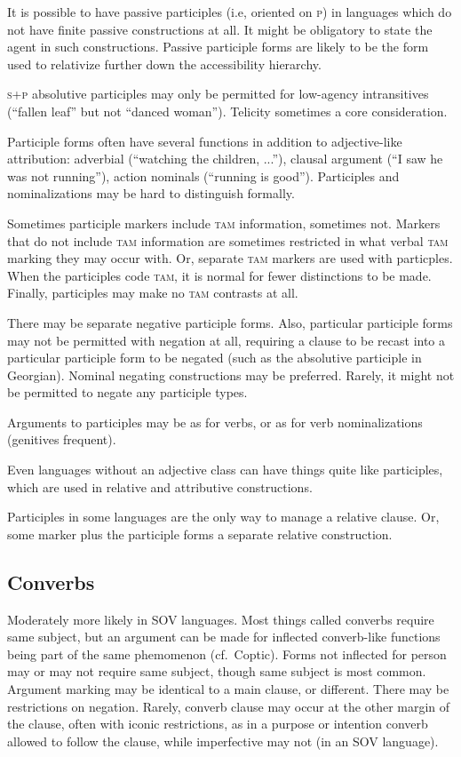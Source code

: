 \documentclass[11pt]{article}
\newcommand{\I}[1]{\textsc{#1}}   %
\begin{document}
It is possible to have passive participles (i.e, oriented on \I{p}) in
languages which do not have finite passive constructions at all.  It
might be obligatory to state the agent in such constructions.  Passive
participle forms are likely to be the form used to relativize further
down the accessibility hierarchy.

\I{s+p} absolutive participles may only be permitted for low-agency
intransitives (``fallen leaf'' but not ``danced woman'').  Telicity
sometimes a core consideration.

Participle forms often have several functions in addition to
adjective-like attribution: adverbial (``watching the children,
...''), clausal argument (``I saw he was not running''), action
nominals (``running is good'').  Participles and nominalizations may
be hard to distinguish formally.

Sometimes participle markers include \I{tam} information, sometimes
not.  Markers that do not include \I{tam} information are sometimes
restricted in what verbal \I{tam} marking they may occur with.  Or,
separate \I{tam} markers are used with particples.  When the
participles code \I{tam}, it is normal for fewer distinctions to be
made.  Finally, participles may make no \I{tam} contrasts at all.

There may be separate negative participle forms.  Also, particular
participle forms may not be permitted with negation at all, requiring
a clause to be recast into a particular participle form to be negated
(such as the absolutive participle in Georgian).  Nominal negating
constructions may be preferred.  Rarely, it might not be permitted to
negate any participle types.

Arguments to participles may be as for verbs, or as for verb
nominalizations (genitives frequent).

Even languages without an adjective class can have things quite like
participles, which are used in relative and attributive constructions. 

Participles in some languages are the only way to manage a relative
clause.  Or, some marker plus the participle forms a separate relative
construction. 


\subsection{Converbs}
Moderately more likely in SOV languages. Most things called converbs
require same subject, but an argument can be made for inflected
converb-like functions being part of the same phemomenon (cf.\
Coptic).  Forms not inflected for person may or may not require same
subject, though same subject is most common.  Argument marking may be
identical to a main clause, or different.  There may be restrictions
on negation.  Rarely, converb clause may occur at the other margin of
the clause, often with iconic restrictions, as in a purpose or
intention converb allowed to follow the clause, while imperfective may
not (in an SOV language).
\end{document}
